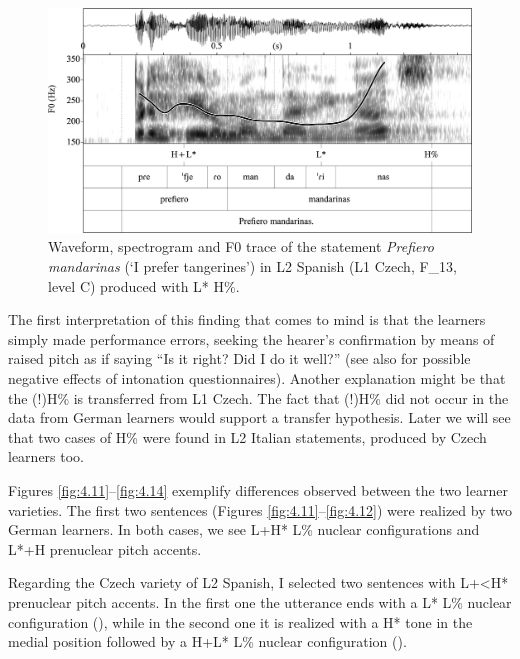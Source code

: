 \begin{figure}


\includegraphics[width=\textwidth]{figures/Figure_4.10.png}


\caption{Waveform, spectrogram and F0 trace of the statement \textit{Prefiero mandarinas} (‘I prefer tangerines’) in L2 Spanish (L1 Czech, F\_13, level C) produced with L* H\%.}
\label{fig:4.10}
\end{figure}

The first interpretation of this finding that comes to mind is that the learners simply made performance errors, seeking the hearer’s confirmation by means of raised pitch as if saying “Is it right? Did I do it well?” (see also \citealt[200]{VanrellEtAl2018} for possible negative effects of intonation questionnaires). Another explanation might be that the (!)H\% is transferred from L1 Czech. The fact that (!)H\% did not occur in the data from German learners would support a transfer hypothesis. Later we will see that two cases of H\% were found in L2 Italian statements, produced by Czech learners too.

\begin{sloppypar}
Figures \ref{fig:4.11}--\ref{fig:4.14} exemplify differences observed between the two learner varieties. The first two sentences (Figures \ref{fig:4.11}--\ref{fig:4.12}) were realized by two German learners. In both cases, we see L+H* L\% nuclear configurations and L*+H prenuclear pitch accents.
\end{sloppypar}



Regarding the Czech variety of L2 Spanish, I selected two sentences with L+<H* prenuclear pitch accents. In the first one the utterance ends with a L* L\% nuclear configuration (), while in the second one it is realized with a H* tone in the medial position followed by a H+L* L\% nuclear configuration ().

